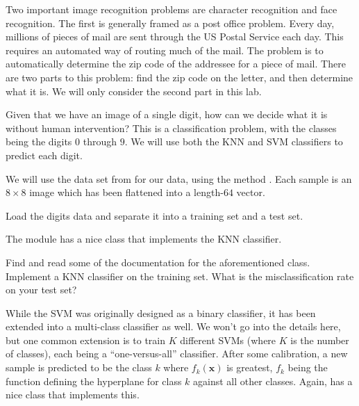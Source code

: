 
Two important image recognition problems are character recognition and face recognition. The first is generally framed as a post office problem. Every day, millions of pieces of mail are sent through the US Postal Service each day. This requires an automated way of routing much of the mail. The problem is to automatically determine the zip code of the addressee for a piece of mail. There are two parts to this problem: find the zip code on the letter, and then determine what it is. We will only consider the second part in this lab.

Given that we have an image of a single digit, how can we decide what it is without human intervention? This is a classification problem, with the classes being the digits $0$ through $9$. We will use both the KNN and SVM classifiers to predict each digit.

We will use the  data set from  for our data, using the method . Each sample is an $8 \times 8$ image which has been flattened into a length-$64$ vector.

\begin{problem}
Load the digits data and separate it into a training set and a test set.
\end{problem}

The module  has a nice class  that implements the KNN classifier.

\begin{problem}
Find and read some of the documentation for the aforementioned class. Implement a KNN classifier on the training set. What is the misclassification rate on your test set?
\end{problem}

While the SVM was originally designed as a binary classifier, it has been extended into a multi-class classifier as well. We won't go into the details here, but one common extension is to train $K$ different SVMs (where $K$ is the number of classes), each being a ``one-versus-all'' classifier. After some calibration, a new sample is predicted to be the class $k$ where $f_{k}(\mathbf{x})$ is greatest, $f_{k}$ being the function defining the hyperplane for class $k$ against all other classes. Again,  has a nice class  that implements this.


